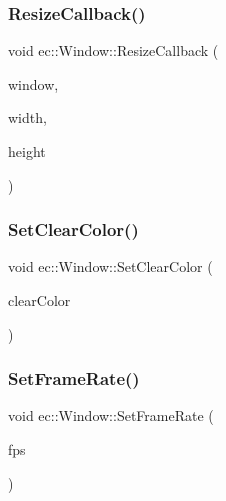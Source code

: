 \mbox{\label{classec_1_1_window_a53866131854aeb378e8a21cf18c9810b}} 
\subsubsection{\texorpdfstring{Resize\+Callback()}{ResizeCallback()}}
{\footnotesize\ttfamily void ec\+::\+Window\+::\+Resize\+Callback (\begin{DoxyParamCaption}\item[{G\+L\+F\+Wwindow $\ast$}]{window,  }\item[{int}]{width,  }\item[{int}]{height }\end{DoxyParamCaption})\hspace{0.3cm}{\ttfamily [virtual]}}

\mbox{\label{classec_1_1_window_af0d59d99e745ebde21fed3b165543a52}} 
\subsubsection{\texorpdfstring{Set\+Clear\+Color()}{SetClearColor()}}
{\footnotesize\ttfamily void ec\+::\+Window\+::\+Set\+Clear\+Color (\begin{DoxyParamCaption}\item[{const glm\+::vec4 \&}]{clear\+Color }\end{DoxyParamCaption})}

\mbox{\label{classec_1_1_window_a5fa670ea10ce548d445e1a82ded336a2}} 
\subsubsection{\texorpdfstring{Set\+Frame\+Rate()}{SetFrameRate()}}
{\footnotesize\ttfamily void ec\+::\+Window\+::\+Set\+Frame\+Rate (\begin{DoxyParamCaption}\item[{const double}]{fps }\end{DoxyParamCaption})\hspace{0.3cm}{\ttfamily [virtual]}}

